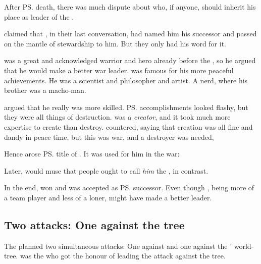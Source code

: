 After \ps{\Nexagglachel} death, there was much dispute about who, if anyone, should inherit his place as leader of the \dragons{}. 

\Ishnaruchaefir{} claimed that \Nexagglachel, in their last conversation, had named him his successor and passed on the mantle of stewardship to him. 
But they only had his word for it. 

\Ishnaruchaefir{} was a great and acknowledged warrior and hero already before the \secondbanewar, so he argued that he would make a better war leader. 
\Secherdamon{} was famous for his more peaceful achievements. 
He was a scientist and philosopher and artist.
A nerd, where his brother was a macho-man. 

\Secherdamon{} argued that he really was more skilled. 
\ps{\Ishnaruchaefir} accomplishments looked flashy, but they were all things of destruction. 
\Secherdamon{} was a \emph{creator}, and it took much more expertise to create than destroy. 
\Ishnaruchaefir{} countered, saying that creation was all fine and dandy in peace time, but this was war, and a destroyer was needed, 

Hence arose \ps{\Ishnaruchaefir} title of . 
It was used for him in the war: 
\begin{prose}
\end{prose}

Later, \Secherdamon{} would muse that people ought to call \emph{him} the , in contrast. 

In the end, \Ishnaruchaefir{} won and was accepted as \ps{\Nexagglachel} successor. 
Even though \Secherdamon, being more of a team player and less of a loner, might have made a better leader. 











\subsection{Two attacks: One against the tree}
The \resphain planned two simultaneous attacks: 
One against \Nexagglachel and one against the \dragons' world-tree. 
 was the \resvil who got the honour of leading the attack against the tree.











